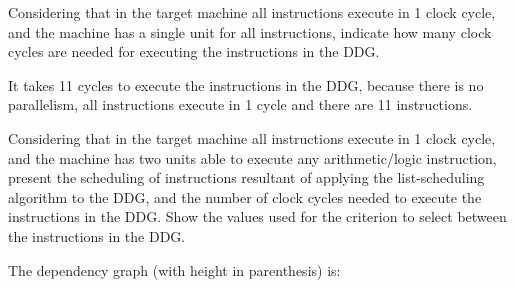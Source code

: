 \documentclass[docid=2021]{comp_exam_round1}
\begin{document}
\begin{center}
    \footnotesize
\end{center}

\question
Considering that in the target machine all instructions execute in 1 clock cycle, and the machine has a single unit for all instructions, indicate how many clock cycles are needed for executing the instructions in the DDG.

\ansseparator

\noindent
It takes 11 cycles to execute the instructions in the DDG, because there is no parallelism, all instructions execute in 1 cycle and there are 11 instructions.

\question
Considering that in the target machine all instructions execute in 1 clock cycle, and the machine has two units able to execute any arithmetic/logic instruction, present the scheduling of instructions resultant of applying the list-scheduling algorithm to the DDG, and the number of clock cycles needed to execute the instructions in the DDG. Show the values used for the criterion to select between the instructions in the DDG.

\ansseparator

\noindent
The dependency graph (with height in parenthesis) is:
\end{document}
